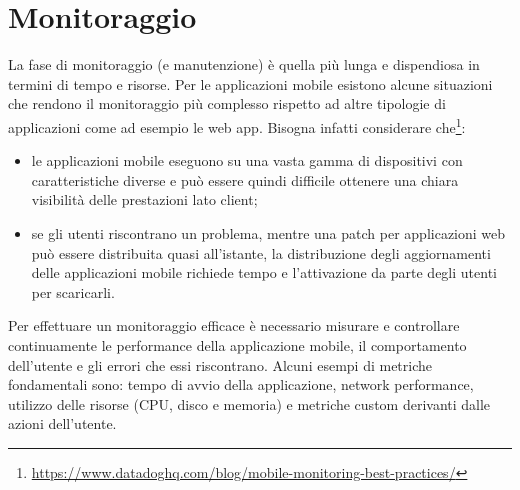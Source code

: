 \section{Monitoraggio}
La fase di monitoraggio (e manutenzione) è quella più lunga e dispendiosa in termini di tempo e risorse. Per le applicazioni mobile esistono alcune situazioni che rendono il monitoraggio più complesso rispetto ad altre tipologie di applicazioni come ad esempio le web app. Bisogna infatti considerare che\footnote{\href{https://www.datadoghq.com/blog/mobile-monitoring-best-practices/}{https://www.datadoghq.com/blog/mobile-monitoring-best-practices/}}:
\begin{itemize}
    \item le applicazioni mobile eseguono su una vasta gamma di dispositivi con caratteristiche diverse e può essere quindi difficile ottenere una chiara visibilità delle prestazioni lato client;
    \item se gli utenti riscontrano un problema, mentre una patch per applicazioni web può essere distribuita quasi all'istante, la distribuzione degli aggiornamenti delle applicazioni mobile richiede tempo e l'attivazione da parte degli utenti per scaricarli.
\end{itemize}
Per effettuare un monitoraggio efficace è necessario misurare e controllare continuamente le performance della applicazione mobile, il comportamento dell'utente e gli errori che essi riscontrano. Alcuni esempi di metriche fondamentali sono: tempo di avvio della applicazione, network performance, utilizzo delle risorse (CPU, disco e memoria) e metriche custom derivanti dalle azioni dell'utente.
